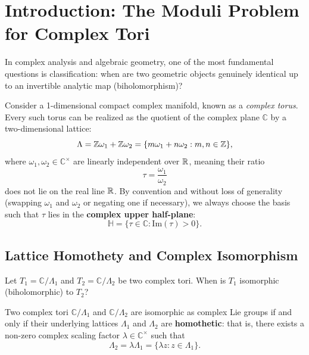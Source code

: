 \documentclass[a4paper]{article}
\begin{document}
\tableofcontents
\newpage

\section{Introduction: The Moduli Problem for Complex Tori}
\label{sec:intro}

In complex analysis and algebraic geometry, one of the most fundamental questions is classification: when are two geometric objects genuinely identical up to an invertible analytic map (biholomorphism)?

Consider a 1-dimensional compact complex manifold, known as a \emph{complex torus}. Every such torus can be realized as the quotient of the complex plane $\mathbb{C}$ by a two-dimensional lattice:
\begin{equation}
 \Lambda = \mathbb{Z}\omega_1 + \mathbb{Z}\omega_2 = \{ m\omega_1 + n\omega_2 : m, n \in \mathbb{Z} \},
\end{equation}
where $\omega_1, \omega_2 \in \mathbb{C}^\times$ are linearly independent over $\mathbb{R}$, meaning their ratio
\begin{equation}
 \tau = \frac{\omega_1}{\omega_2}
\end{equation}
does not lie on the real line $\mathbb{R}$. By convention and without loss of generality (swapping $\omega_1$ and $\omega_2$ or negating one if necessary), we always choose the basis such that $\tau$ lies in the \textbf{complex upper half-plane}:
\begin{equation}
 \mathbb{H} = \{ \tau \in \mathbb{C} : \mathrm{Im}(\tau) > 0 \}.
\end{equation}

\subsection{Lattice Homothety and Complex Isomorphism}
Let $T_1 = \mathbb{C}/\Lambda_1$ and $T_2 = \mathbb{C}/\Lambda_2$ be two complex tori. When is $T_1$ isomorphic (biholomorphic) to $T_2$?
\begin{proposition}
Two complex tori $\mathbb{C}/\Lambda_1$ and $\mathbb{C}/\Lambda_2$ are isomorphic as complex Lie groups if and only if their underlying lattices $\Lambda_1$ and $\Lambda_2$ are \textbf{homothetic}: that is, there exists a non-zero complex scaling factor $\lambda \in \mathbb{C}^\times$ such that
\begin{equation}
 \Lambda_2 = \lambda \Lambda_1 = \{ \lambda z : z \in \Lambda_1 \}.
\end{equation}
\end{proposition}
\end{document}
